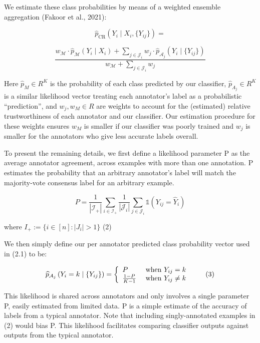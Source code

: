\documentclass[
]{article}
\begin{document}
We estimate these class probabilities by means of a weighted ensemble
aggregation (Fakoor et al., 2021):

\[
\widehat {p} _ {\mathrm{CR}} (Y _ {i} \mid X _ {i}, \{Y _ {i j} \}) =
\]

\[
\frac {w _ {\mathcal {M}} \cdot \widehat {p} _ {\mathcal {M}} (Y _ {i} \mid X _ {i}) + \sum_ {j \in \mathcal {J} _ {i}} w _ {j} \cdot \widehat {p} _ {\mathcal {A} _ {j}} (Y _ {i} \mid \{Y _ {i j} \})}{w _ {\mathcal {M}} + \sum_ {j \in \mathcal {J} _ {i}} w _ {j}}
\]

Here \(\widehat{p}_{M} \in R^{K}\) is the probability of each class
predicted by our classifier, \(\widehat{p}_{A_{j}} \in R^{K}\) is a
similar likelihood vector treating each annotator's label as a
probabilistic ``prediction'', and \(w_{j}, w_{M} \in R\) are weights to
account for the (estimated) relative trustworthiness of each annotator
and our classifier. Our estimation procedure for these weights ensures
\(w_{M}\) is smaller if our classifier was poorly trained and \(w_{j}\)
is smaller for the annotators who give less accurate labels overall.

To present the remaining details, we first define a likelihood parameter
P as the average annotator agreement, across examples with more than one
annotation. P estimates the probability that an arbitrary annotator's
label will match the majority-vote consensus label for an arbitrary
example.

\[
P = \frac {1}{| \mathcal {I} _ {+} |} \sum_ {i \in \mathcal {I} _ {+}} \frac {1}{| \mathcal {J} _ {i} |} \sum_ {j \in \mathcal {J} _ {i}} \mathbb {1} (Y _ {i j} = \hat {Y} _ {i})
\]

where \(I_{+} := \{i \in [n] : |J_{i}| > 1\}\) (2)

We then simply define our per annotator predicted class probability
vector used in (2.1) to be:

\[
\widehat {p} _ {\mathcal {A} _ {j}} \left(Y _ {i} = k \mid \left\{Y _ {i j} \right\}\right) = \left\{ \begin{array}{l l} P & \text { when } Y _ {i j} = k \\ \frac {1 - P}{K - 1} & \text { when } Y _ {i j} \neq k \end{array} \right. \tag {3}
\]

This likelihood is shared across annotators and only involves a single
parameter P, easily estimated from limited data. P is a simple estimate
of the accuracy of labels from a typical annotator. Note that including
singly-annotated examples in (2) would bias P. This likelihood
facilitates comparing classifier outputs against outputs from the
typical annotator.
\end{document}
